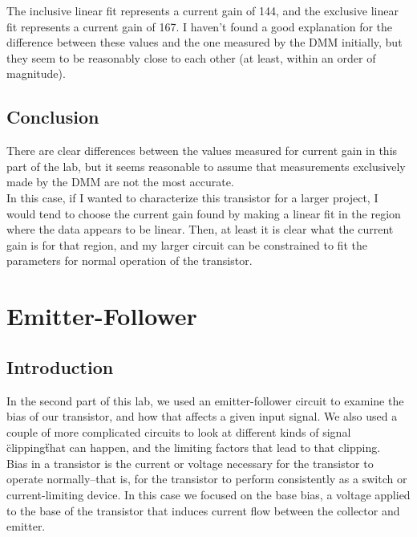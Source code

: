 \documentclass[11pt]{article}
\begin{document}
The inclusive linear fit represents a current gain of 144, and the exclusive linear fit represents a current gain of 167. I haven't found a good explanation for the difference between these values and the one measured by the DMM initially, but they seem to be reasonably close to each other (at least, within an order of magnitude).\\

\subsection{Conclusion}

There are clear differences between the values measured for current gain in this part of the lab, but it seems reasonable to assume that measurements exclusively made by the DMM are not the most accurate.\\

In this case, if I wanted to characterize this transistor for a larger project, I would tend to choose the current gain found by making a linear fit in the region where the data appears to be linear. Then, at least it is clear what the current gain is for that region, and my larger circuit can be constrained to fit the parameters for normal operation of the transistor.\\
    

\section{Emitter-Follower}
\subsection{Introduction}

In the second part of this lab, we used an emitter-follower circuit to examine the bias of our transistor, and how that affects a given input signal. We also used a couple of more complicated circuits to look at different kinds of signal \"clipping\" that can happen, and the limiting factors that lead to that clipping.\\

Bias in a transistor is the current or voltage necessary for the transistor to operate normally--that is, for the transistor to perform consistently as a switch or current-limiting device. In this case we focused on the base bias, a voltage applied to the base of the transistor that induces current flow between the collector and emitter.\\
\end{document}
